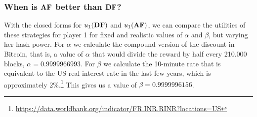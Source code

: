 \subsubsection{When is $\text{\rm {\bf AF}}$ better than $\text{\rm {\bf DF}}$?}
With the closed forms for $u_1(\text{\rm {\bf DF}})$ and $u_1(\text{\rm {\bf AF}})$,
we can compare the utilities of these strategies for player 1 for fixed and realistic values of $\alpha$ and $\beta$, but varying her hash power. 
For $\alpha$ we calculate the compound version of the discount in Bitcoin, that is, 
a value of $\alpha$ that would divide the reward by half every 210.000 blocks, \ie $\alpha = 0.9999966993$. For 
$\beta$ we calculate the 10-minute rate that is equivalent to the US real interest rate in 
the last few years, which is approximately 2\%.\footnote{\url{https://data.worldbank.org/indicator/FR.INR.RINR?locations=US}}
This gives us a value of $\beta = 0.9999996156$. 


